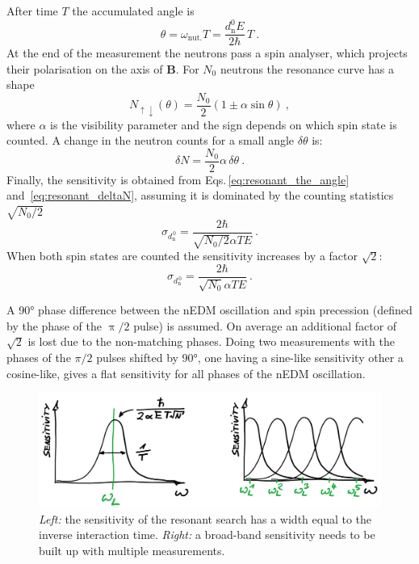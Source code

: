 After time $T$ the accumulated angle is
\begin{equation}
  \theta = \omega_\text{nut.} T = \frac{d_\text{n}^0 E }{2 \hbar} \, T \ .
  \label{eq:resonant_the_angle}
\end{equation}
At the end of the measurement the neutrons pass a spin analyser, which projects their polarisation on the axis of $\mathbf{B}$.
For $N_0$ neutrons the resonance curve has a shape
\begin{equation}
  N_{\uparrow \downarrow}(\theta) = \frac{N_0}{2} \left( 1 \pm \alpha \sin \theta  \right)  \ ,
\end{equation}
where $\alpha$ is the visibility parameter and the sign depends on which spin state is counted.
A change in the neutron counts for a small angle $\delta \theta$ is:
\begin{equation}
  \delta N = \frac{N_0}{2} \alpha \, \delta \theta \ .
  \label{eq:resonant_deltaN}
\end{equation}
Finally, the sensitivity is obtained from Eqs.\,\ref{eq:resonant_the_angle} and~\ref{eq:resonant_deltaN}, assuming it is dominated by the counting statistics $\sqrt{N_0/2}$
\begin{equation}
  \sigma_{d_\text{n}^{\,0}} = \frac{2 \hbar}{\sqrt{N_0/2} \alpha T E} \ .
\end{equation}
When both spin states are counted the sensitivity increases by a factor $\sqrt{2}$:
\begin{equation}
  \sigma_{d_\text{n}^{\,0}} = \frac{2 \hbar}{\sqrt{N_0} \alpha T E} \ .
\end{equation}

A \ang{90} phase difference between the nEDM oscillation and spin precession (defined by the phase of the $\uppi/2$ pulse) is assumed.
On average an additional factor of $\sqrt{2}$ is lost due to the non-matching phases.
Doing two measurements with the phases of the $\pi/2$ pulses shifted by \ang{90}, one having a sine-like sensitivity other a cosine-like, gives a flat sensitivity for all phases of the nEDM oscillation.

\begin{figure}
  \centering
  \includegraphics[width=\linewidth]{gfx/axions/resonant_sensitivity.png}
  \caption{\emph{Left:} the sensitivity of the resonant search has a width equal to the inverse interaction time.
  \emph{Right:} a broad-band sensitivity needs to be built up with multiple measurements.}\label{fig:axions_resonant_sensitivity}
\end{figure}

